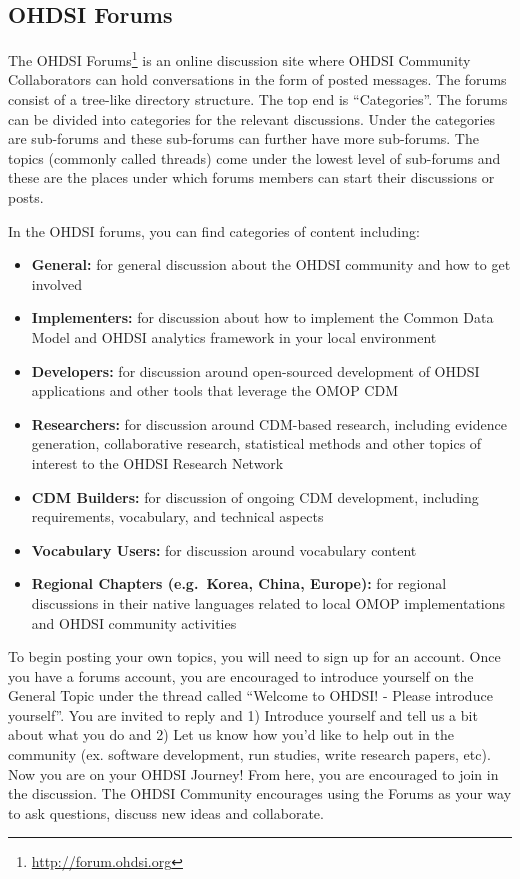 \documentclass[11pt]{book}
\providecommand{\tightlist}{%
  \setlength{\itemsep}{0pt}\setlength{\parskip}{0pt}}
\let\rmarkdownfootnote\footnote%
\def\footnote{\protect\rmarkdownfootnote}
\theoremstyle{definition}
\theoremstyle{definition}
\theoremstyle{definition}
\theoremstyle{remark}
\begin{document}
\subsection{OHDSI Forums}\label{ohdsi-forums}

The OHDSI Forums\footnote{\url{http://forum.ohdsi.org}} is an online
discussion site where OHDSI Community Collaborators can hold
conversations in the form of posted messages. The forums consist of a
tree-like directory structure. The top end is ``Categories''. The forums
can be divided into categories for the relevant discussions. Under the
categories are sub-forums and these sub-forums can further have more
sub-forums. The topics (commonly called threads) come under the lowest
level of sub-forums and these are the places under which forums members
can start their discussions or posts.

In the OHDSI forums, you can find categories of content including:

\begin{itemize}
\tightlist
\item
  \textbf{General:} for general discussion about the OHDSI community and
  how to get involved
\item
  \textbf{Implementers:} for discussion about how to implement the
  Common Data Model and OHDSI analytics framework in your local
  environment
\item
  \textbf{Developers:} for discussion around open-sourced development of
  OHDSI applications and other tools that leverage the OMOP CDM
\item
  \textbf{Researchers:} for discussion around CDM-based research,
  including evidence generation, collaborative research, statistical
  methods and other topics of interest to the OHDSI Research Network
\item
  \textbf{CDM Builders:} for discussion of ongoing CDM development,
  including requirements, vocabulary, and technical aspects
\item
  \textbf{Vocabulary Users:} for discussion around vocabulary content
\item
  \textbf{Regional Chapters (e.g.~Korea, China, Europe):} for regional
  discussions in their native languages related to local OMOP
  implementations and OHDSI community activities
\end{itemize}

To begin posting your own topics, you will need to sign up for an
account. Once you have a forums account, you are encouraged to introduce
yourself on the General Topic under the thread called ``Welcome to
OHDSI! - Please introduce yourself''. You are invited to reply and 1)
Introduce yourself and tell us a bit about what you do and 2) Let us
know how you'd like to help out in the community (ex. software
development, run studies, write research papers, etc). Now you are on
your OHDSI Journey! From here, you are encouraged to join in the
discussion. The OHDSI Community encourages using the Forums as your way
to ask questions, discuss new ideas and collaborate. 
\end{document}
